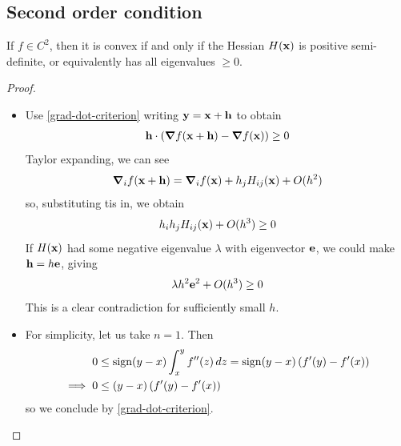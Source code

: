 \documentclass{../template/note}
\begin{document}
    \subsection{Second order condition}

    \begin{theorem}
        \label{second-order-condition}
        If $f \in C^2$, then it is convex if and only if the Hessian $H(\V x)$ is positive semi-definite, or equivalently has all eigenvalues $\geq 0$.
    \end{theorem}
    
    \begin{proof}
        \begin{itemize}
            \item[$\implies$] Use \cref{grad-dot-criterion} writing $\V y = \V x + \V h$ to obtain
            \begin{align*}
                \V h \cdot \left(\grad f(\V x + \V h) - \grad f(\V x)\right) \geq 0
            \end{align*}
            Taylor expanding, we can see
            \begin{align*}
                \grad_i f(\V x + \V h) = \grad_i f(\V x) + h_j H_{ij} (\V x) + O(h^2)
            \end{align*}
            so, substituting tis in, we obtain
            \begin{align*}
                h_i h_j H_{ij}(\V x) + O(h^3) \geq 0
            \end{align*}
            If $H(\V x)$ had some negative eigenvalue $\lambda$ with eigenvector $\V e$, we could make $\V h = h \V e$, giving
            \begin{align*}
                \lambda h^2 \V e^2 + O(h^3) \geq 0
            \end{align*}
            This is a clear contradiction for sufficiently small $h$.
            \item[$\impliedby$] For simplicity, let us take $n=1$. Then
            \begin{align*}
                0 &\leq \operatorname{sign}(y-x) \int_x^y f''(z) \,d{z} = \operatorname{sign}(y-x) \left(f'(y)-f'(x)\right) \\
                \implies 0 &\leq (y-x) \left(f'(y)-f'(x)\right)
            \end{align*}
            so we conclude by \cref{grad-dot-criterion}.            
        \end{itemize}
    \end{proof}
    
\end{document}
